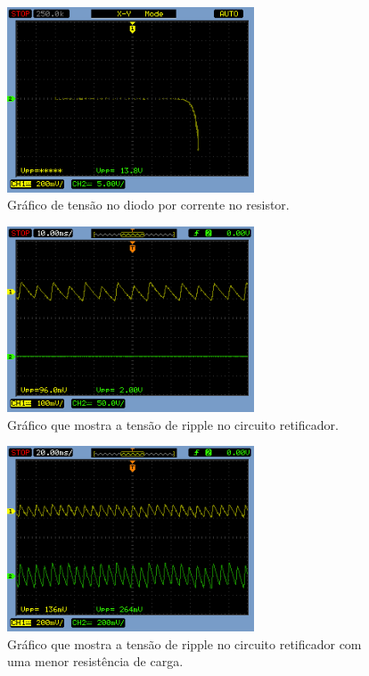 \documentclass{article}
\begin{document}
\begin{figure}[h!]
    \centering
    \includegraphics[height=5.5cm]{imgSource/tensaoDioxcorrRes.png}
    \caption{Gráfico de tensão no diodo por corrente no resistor.}
    \label{fig:tensaoxcorrente}
\end{figure}

\begin{figure}[h!]
    \centering
    \includegraphics[height=5.5cm]{imgSource/rippleRet.png}
    \caption{Gráfico que mostra a tensão de ripple no circuito retificador.}
    \label{fig:rippleRet}
\end{figure}

\begin{figure}[h!]
    \centering
    \includegraphics[height=5.5cm]{imgSource/rippleResMenor.png}
    \caption{Gráfico que mostra a tensão de ripple no circuito retificador com uma menor resistência de carga.}
    \label{fig:rippleResMenor}
\end{figure}
\end{document}
